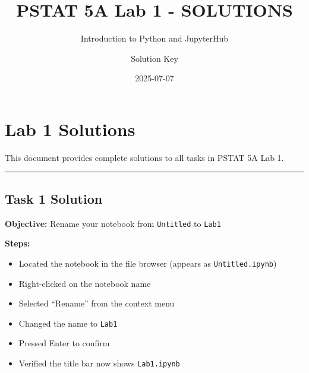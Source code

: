 \documentclass[
  11pt,
]{article}
\title{PSTAT 5A Lab 1 - SOLUTIONS}
\subtitle{Introduction to Python and JupyterHub}
\author{Solution Key}
\date{2025-07-07}
\renewcommand*\contentsname{Table of contents}
\newcommand\contentsname{Table of contents}
\begin{document}
\maketitle

\renewcommand*\contentsname{Table of contents}
{
\hypersetup{linkcolor=}
\setcounter{tocdepth}{3}
\tableofcontents
}


\section{Lab 1 Solutions}\label{lab-1-solutions}

This document provides complete solutions to all tasks in PSTAT 5A Lab
1.

\begin{center}\rule{0.5\linewidth}{0.5pt}\end{center}

\subsection{Task 1 Solution}\label{task-1-solution}

\textbf{Objective:} Rename your notebook from \texttt{Untitled} to
\texttt{Lab1}

\textbf{Steps:}

\begin{itemize}
\item
  Located the notebook in the file browser (appears as
  \texttt{Untitled.ipynb})
\item
  Right-clicked on the notebook name
\item
  Selected ``Rename'' from the context menu
\item
  Changed the name to \texttt{Lab1}
\item
  Pressed Enter to confirm
\item
  Verified the title bar now shows \texttt{Lab1.ipynb}
\end{itemize}
\end{document}
